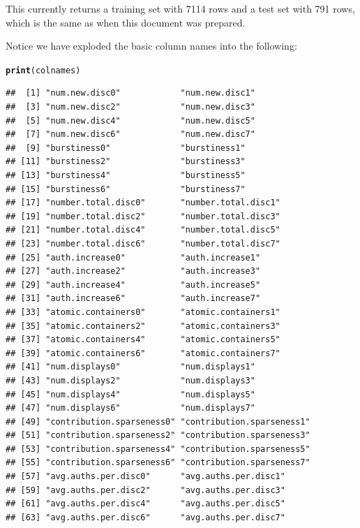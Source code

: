 \documentclass{article}\usepackage[]{graphicx}\usepackage[]{color}
\makeatletter
\newcommand{\hlstd}[1]{\textcolor[rgb]{0.345,0.345,0.345}{#1}}%
\newcommand{\hlkwd}[1]{\textcolor[rgb]{0.737,0.353,0.396}{\textbf{#1}}}%
\newenvironment{kframe}{%
 \def\at@end@of@kframe{}%
 \ifinner\ifhmode%
  \def\at@end@of@kframe{\end{minipage}}%
  \begin{minipage}{\columnwidth}%
 \fi\fi%
 \def\FrameCommand##1{\hskip\@totalleftmargin \hskip-\fboxsep
 \colorbox{shadecolor}{##1}\hskip-\fboxsep
     \hskip-\linewidth \hskip-\@totalleftmargin \hskip\columnwidth}%
 \MakeFramed {\advance\hsize-\width
   \@totalleftmargin\z@ \linewidth\hsize
   \@setminipage}}%
 {\par\unskip\endMakeFramed%
 \at@end@of@kframe}
\newenvironment{knitrout}{}{} %
\makeatother
\begin{document}
This currently returns a training set with 7114 rows and a test set with 
791 rows, which 
is the same
as when this document was prepared.

Notice we have exploded the basic column names into the following:
\begin{knitrout}
\color{fgcolor}\begin{kframe}
\begin{alltt}
\hlkwd{print}\hlstd{(colnames)}
\end{alltt}
\begin{verbatim}
##  [1] "num.new.disc0"            "num.new.disc1"           
##  [3] "num.new.disc2"            "num.new.disc3"           
##  [5] "num.new.disc4"            "num.new.disc5"           
##  [7] "num.new.disc6"            "num.new.disc7"           
##  [9] "burstiness0"              "burstiness1"             
## [11] "burstiness2"              "burstiness3"             
## [13] "burstiness4"              "burstiness5"             
## [15] "burstiness6"              "burstiness7"             
## [17] "number.total.disc0"       "number.total.disc1"      
## [19] "number.total.disc2"       "number.total.disc3"      
## [21] "number.total.disc4"       "number.total.disc5"      
## [23] "number.total.disc6"       "number.total.disc7"      
## [25] "auth.increase0"           "auth.increase1"          
## [27] "auth.increase2"           "auth.increase3"          
## [29] "auth.increase4"           "auth.increase5"          
## [31] "auth.increase6"           "auth.increase7"          
## [33] "atomic.containers0"       "atomic.containers1"      
## [35] "atomic.containers2"       "atomic.containers3"      
## [37] "atomic.containers4"       "atomic.containers5"      
## [39] "atomic.containers6"       "atomic.containers7"      
## [41] "num.displays0"            "num.displays1"           
## [43] "num.displays2"            "num.displays3"           
## [45] "num.displays4"            "num.displays5"           
## [47] "num.displays6"            "num.displays7"           
## [49] "contribution.sparseness0" "contribution.sparseness1"
## [51] "contribution.sparseness2" "contribution.sparseness3"
## [53] "contribution.sparseness4" "contribution.sparseness5"
## [55] "contribution.sparseness6" "contribution.sparseness7"
## [57] "avg.auths.per.disc0"      "avg.auths.per.disc1"     
## [59] "avg.auths.per.disc2"      "avg.auths.per.disc3"     
## [61] "avg.auths.per.disc4"      "avg.auths.per.disc5"     
## [63] "avg.auths.per.disc6"      "avg.auths.per.disc7"     

\end{verbatim}
\end{kframe}
\end{knitrout}
\end{document}
